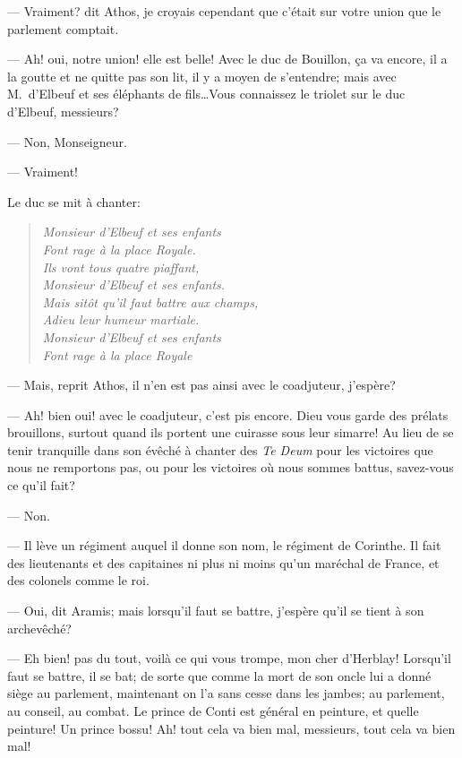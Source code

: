 — Vraiment? dit Athos, je croyais cependant que c'était sur votre union que le parlement comptait.

— Ah! oui, notre union! elle est belle! Avec le duc de Bouillon, ça va encore, il a la goutte et ne quitte pas son lit, il y a moyen de s'entendre; mais avec M.~d'Elbeuf et ses éléphants de fils\dots Vous connaissez le triolet sur le duc d'Elbeuf, messieurs?

— Non, Monseigneur.

— Vraiment!

Le duc se mit à chanter:

\begin{verse}\itshape
Monsieur d'Elbeuf et ses enfants\\
Font rage à la place Royale.\\
Ils vont tous quatre piaffant,\\
Monsieur d'Elbeuf et ses enfants.\\
Mais sitôt qu'il faut battre aux champs,\\
Adieu leur humeur martiale.\\
Monsieur d'Elbeuf et ses enfants\\
Font rage à la place Royale
\end{verse}

— Mais, reprit Athos, il n'en est pas ainsi avec le coadjuteur, j'espère?

— Ah! bien oui! avec le coadjuteur, c'est pis encore. Dieu vous garde des prélats brouillons, surtout quand ils portent une cuirasse sous leur simarre! Au lieu de se tenir tranquille dans son évêché à chanter des \textit{Te Deum} pour les victoires que nous ne remportons pas, ou pour les victoires où nous sommes battus, savez-vous ce qu'il fait?

— Non.

— Il lève un régiment auquel il donne son nom, le régiment de Corinthe. Il fait des lieutenants et des capitaines ni plus ni moins qu'un maréchal de France, et des colonels comme le roi.

— Oui, dit Aramis; mais lorsqu'il faut se battre, j'espère qu'il se tient à son archevêché?

— Eh bien! pas du tout, voilà ce qui vous trompe, mon cher d'Herblay! Lorsqu'il faut se battre, il se bat; de sorte que comme la mort de son oncle lui a donné siège au parlement, maintenant on l'a sans cesse dans les jambes; au parlement, au conseil, au combat. Le prince de Conti est général en peinture, et quelle peinture! Un prince bossu! Ah! tout cela va bien mal, messieurs, tout cela va bien mal!


